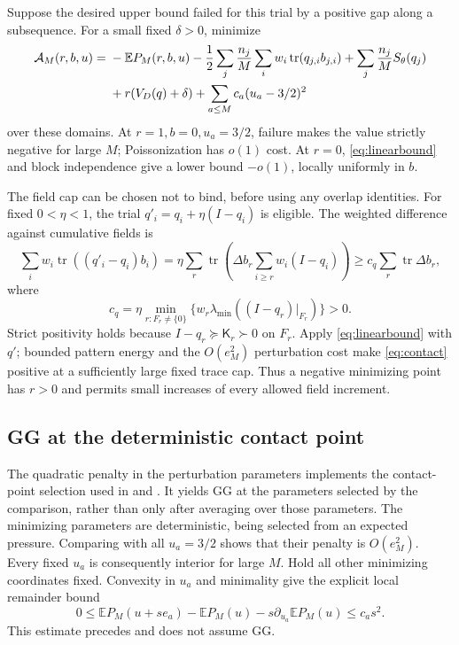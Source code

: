 \documentclass[11pt]{article}
\numberwithin{equation}{section}
\theoremstyle{definition}
\newcommand{\E}{\mathbb E}
\newcommand{\tr}{\operatorname{tr}}
\begin{document}
Suppose the desired upper bound failed for this trial by a positive gap along a subsequence. For a small fixed $\delta>0$, minimize
\begin{align}\label{eq:contact}
\mathcal A_M(r,b,u)={}&-\E P_M(r,b,u)
-\frac12\sum_j\frac{n_j}{M}\sum_iw_i\tr(q_{j,i}b_{j,i})
+\sum_j\frac{n_j}{M}S_\theta(q_j)\notag\\
&+r(V_D(q)+\delta)+\sum_{a\le M}c_a(u_a-3/2)^2
\end{align}
over these domains. At $r=1,b=0,u_a=3/2$, failure makes the value strictly negative for large $M$; Poissonization has $o(1)$ cost. At $r=0$, \eqref{eq:linearbound} and block independence give a lower bound $-o(1)$, locally uniformly in $b$.

The field cap can be chosen not to bind, before using any overlap identities. For fixed $0<\eta<1$, the trial $q'_i=q_i+\eta(I-q_i)$ is eligible. The weighted difference against cumulative fields is
\[
\sum_iw_i\tr((q'_i-q_i)b_i)
=\eta\sum_r\tr\left(\Delta b_r\sum_{i\ge r}w_i(I-q_i)\right)
\ge c_q\sum_r\tr\Delta b_r,
\]
where
\[
c_q=\eta\min_{r:F_r\ne\{0\}}
\{w_r\lambda_{\min}((I-q_r)|_{F_r})\}>0.
\]
Strict positivity holds because $I-q_r\succeq\mathsf K_r\succ0$ on $F_r$. Apply \eqref{eq:linearbound} with $q'$; bounded pattern energy and the $O(e_M^2)$ perturbation cost make \eqref{eq:contact} positive at a sufficiently large fixed trace cap. Thus a negative minimizing point has $r>0$ and permits small increases of every allowed field increment.

\subsection{GG at the deterministic contact point}
The quadratic penalty in the perturbation parameters implements the contact-point selection used in \cite[proof of Theorem~4.1]{Mourrat2021} and \cite[proof of Proposition~5.1]{Mourrat2023}. It yields GG at the parameters selected by the comparison, rather than only after averaging over those parameters.
The minimizing parameters are deterministic, being selected from an expected pressure. Comparing with all $u_a=3/2$ shows that their penalty is $O(e_M^2)$. Every fixed $u_a$ is consequently interior for large $M$. Hold all other minimizing coordinates fixed. Convexity in $u_a$ and minimality give the explicit local remainder bound
\begin{equation}\label{eq:contactremainder}
0\le\E P_M(u+s e_a)-\E P_M(u)-s\partial_{u_a}\E P_M(u)
\le c_a s^2.
\end{equation}
This estimate precedes and does not assume GG.
\end{document}
